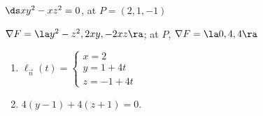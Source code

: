 {$\ds xy^2-xz^2=0$, at $P = (2,1,-1)$
}
{
$\nabla F = \la y^2-z^2, 2xy, -2xz\ra$; at $P$, $\nabla F = \la 0, 4, 4\ra$
\begin{enumerate}
	\item $\ell_{\vec n}(t) = \left\{\begin{array}{l} x= 2 \\ y = 1+4t\\ z = -1+4t \end{array}\right.$
	\item		$4(y-1) + 4(z+1) = 0$.
\end{enumerate}
}